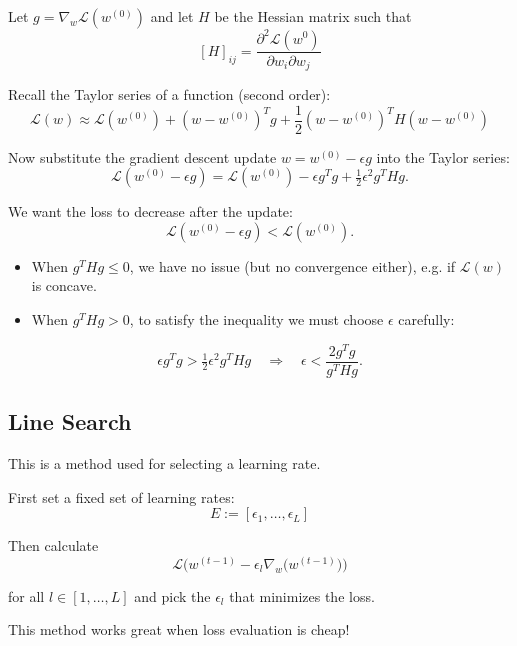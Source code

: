 \documentclass[11pt]{article}
\begin{document}
Let $g = \nabla_w \mathcal{L}(w^{(0)})$ and let $H$ be the Hessian matrix such that
\[
	[H]_{ij} = \frac{\partial^2 \mathcal{L}(w^{0})}{\partial w_i \partial w_j}
\]

Recall the Taylor series of a function (second order):
\[
	\mathcal{L}(w) \approx \mathcal{L}(w^{(0)}) + (w - w^{(0)})^T g
	+ \frac{1}{2}(w - w^{(0)})^T H (w - w^{(0)})
\]

Now substitute the gradient descent update $w = w^{(0)} - \epsilon g$
into the Taylor series:
\[
	\mathcal{L}(w^{(0)} - \epsilon g)
	= \mathcal{L}(w^{(0)}) - \epsilon g^T g
	+ \tfrac{1}{2}\epsilon^2 g^T H g.
\]

We want the loss to decrease after the update:
\[
	\mathcal{L}(w^{(0)} - \epsilon g) < \mathcal{L}(w^{(0)}).
\]

\begin{itemize}
	\item When \( g^T H g \leq 0 \), we have no issue (but no convergence either), e.g. if \(\mathcal{L}(w)\) is concave.
	\item When \( g^T H g > 0 \), to satisfy the inequality we must choose \(\epsilon\) carefully:
\end{itemize}

\[
	\epsilon g^T g > \tfrac{1}{2}\epsilon^2 g^T H g
	\quad \Rightarrow \quad
	\epsilon < \frac{2 g^T g}{g^T H g}.
\]


\subsection*{Line Search}
This is a method used for selecting a learning rate.

\medskip

First set a fixed set of learning rates:
\[
	E := [\epsilon_1, \ldots, \epsilon_L]
\]

Then calculate
\[
	\mathcal{L}\!\Big(w^{(t-1)} - \epsilon_l \nabla_w \big(w^{(t-1)}\big)\Big)
\]

for all $l \in [1, \ldots, L]$ and pick the $\epsilon_l$ that minimizes the loss.

\medskip

This method works great when loss evaluation is cheap!
\end{document}
